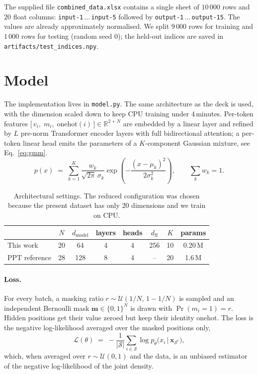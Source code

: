\documentclass[11pt,a4paper]{article}
\begin{document}
The supplied file \texttt{combined\_data.xlsx} contains a single sheet of
$10\,000$ rows and $20$ float columns: \texttt{input-1}\,$\dots$\,\texttt{input-5}
followed by \texttt{output-1}\,$\dots$\,\texttt{output-15}. The values are
already approximately normalised. We split $9\,000$ rows for training and
$1\,000$ rows for testing (random seed $0$); the held-out indices are saved
in \texttt{artifacts/test\_indices.npy}.

\section{Model}

The implementation lives in \texttt{model.py}. The same architecture as the
deck is used, with the dimension scaled down to keep CPU training under
4\,minutes. Per-token features
$\bigl[\,v_i,\;m_i,\;\mathrm{onehot}(i)\,\bigr]\in\mathbb{R}^{2+N}$ are
embedded by a linear layer and refined by $L$ pre-norm Transformer
encoder layers with full bidirectional attention; a per-token linear head
emits the parameters of a $K$-component Gaussian mixture, see
Eq.~\ref{eq:gmm}.
\begin{equation}
  p(x) \;=\; \sum_{k=1}^{K}\frac{w_k}{\sqrt{2\pi}\,\sigma_k}
              \exp\!\left(-\frac{(x-\mu_k)^{2}}{2\sigma_k^{2}}\right),
  \qquad \sum_k w_k = 1.
  \label{eq:gmm}
\end{equation}

\begin{table}[h]\centering\small
\begin{tabular}{lccccccc}
\toprule
 & $N$ & $d_{\text{model}}$ & layers & heads & $d_{\text{ff}}$ & $K$ & params \\\midrule
This work        & 20 & 64  & 4 & 4 & 256  & 10 & 0.20\,M \\
PPT reference    & 28 & 128 & 8 & 4 & --   & 20 & 1.6\,M  \\
\bottomrule
\end{tabular}
\caption{Architectural settings. The reduced configuration was chosen because
the present dataset has only 20 dimensions and we train on CPU.}
\end{table}

\paragraph{Loss.}
For every batch, a masking ratio $r\sim\mathcal{U}(1/N,\,1{-}1/N)$ is sampled
and an independent Bernoulli mask $\mathbf{m}\in\{0,1\}^{N}$ is drawn with
$\Pr(m_i{=}1)=r$. Hidden positions get their value zeroed but keep their
identity onehot. The loss is the negative log-likelihood averaged over the
masked positions only,
\begin{equation}
  \mathcal{L}(\theta) \;=\; -\frac{1}{|\mathcal{S}|}
        \sum_{i\in\mathcal{S}} \log p_\theta\bigl(x_i\,\big|\,\mathbf{x}_{\mathcal{S}^{c}}\bigr),
\end{equation}
which, when averaged over $r\sim\mathcal{U}(0,1)$ and the data, is an
unbiased estimator of the negative log-likelihood of the joint density.
\end{document}
